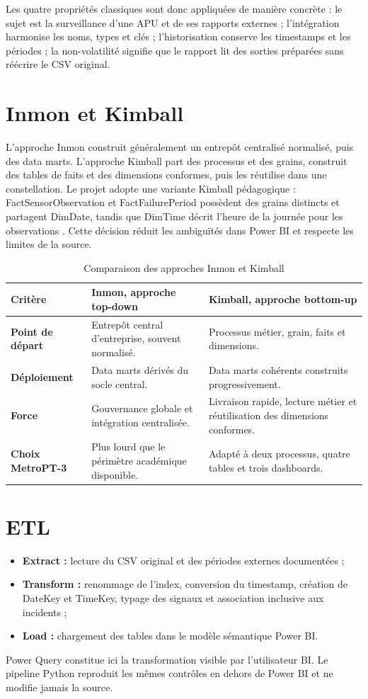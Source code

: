 Les quatre propriétés classiques sont donc appliquées de manière concrète : le sujet est la surveillance d'une APU et de ses rapports externes ; l'intégration harmonise les noms, types et clés ; l'historisation conserve les timestamps et les périodes ; la non-volatilité signifie que le rapport lit des sorties préparées sans réécrire le CSV original.

\section{Inmon et Kimball}
L'approche Inmon construit généralement un entrepôt centralisé normalisé, puis des data marts. L'approche Kimball part des processus et des grains, construit des tables de faits et des dimensions conformes, puis les réutilise dans une constellation. Le projet adopte une variante Kimball pédagogique : FactSensorObservation et FactFailurePeriod possèdent des grains distincts et partagent DimDate, tandis que DimTime décrit l'heure de la journée pour les observations \cite{kimball2013}. Cette décision réduit les ambiguïtés dans Power BI et respecte les limites de la source.

\begin{table}[H]
\centering
\caption{Comparaison des approches Inmon et Kimball}
\label{tab:inmon-kimball}
\begin{tabularx}{\textwidth}{>{\bfseries}l X X}
\toprule
Critère & Inmon, approche top-down & Kimball, approche bottom-up\\
\midrule
Point de départ & Entrepôt central d'entreprise, souvent normalisé. & Processus métier, grain, faits et dimensions.\\
Déploiement & Data marts dérivés du socle central. & Data marts cohérents construits progressivement.\\
Force & Gouvernance globale et intégration centralisée. & Livraison rapide, lecture métier et réutilisation des dimensions conformes.\\
Choix MetroPT-3 & Plus lourd que le périmètre académique disponible. & Adapté à deux processus, quatre tables et trois dashboards.\\
\bottomrule
\end{tabularx}
\end{table}

\section{ETL}
\begin{itemize}
\item \textbf{Extract :} lecture du CSV original et des périodes externes documentées ;
\item \textbf{Transform :} renommage de l'index, conversion du timestamp, création de DateKey et TimeKey, typage des signaux et association inclusive aux incidents ;
\item \textbf{Load :} chargement des tables dans le modèle sémantique Power BI.
\end{itemize}
Power Query constitue ici la transformation visible par l'utilisateur BI. Le pipeline Python reproduit les mêmes contrôles en dehors de Power BI et ne modifie jamais la source.

